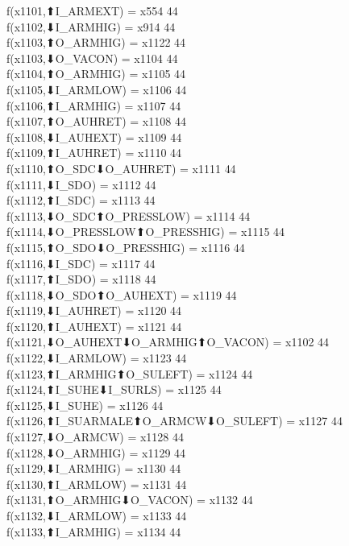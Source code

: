 f(x1101,⬆I_ARMEXT) = x554 {44} \\
f(x1102,⬇I_ARMHIG) = x914 {44} \\
f(x1103,⬆O_ARMHIG) = x1122 {44} \\
f(x1103,⬇O_VACON) = x1104 {44} \\
f(x1104,⬆O_ARMHIG) = x1105 {44} \\
f(x1105,⬇I_ARMLOW) = x1106 {44} \\
f(x1106,⬆I_ARMHIG) = x1107 {44} \\
f(x1107,⬆O_AUHRET) = x1108 {44} \\
f(x1108,⬇I_AUHEXT) = x1109 {44} \\
f(x1109,⬆I_AUHRET) = x1110 {44} \\
f(x1110,⬆O_SDC⬇O_AUHRET) = x1111 {44} \\
f(x1111,⬇I_SDO) = x1112 {44} \\
f(x1112,⬆I_SDC) = x1113 {44} \\
f(x1113,⬇O_SDC⬆O_PRESSLOW) = x1114 {44} \\
f(x1114,⬇O_PRESSLOW⬆O_PRESSHIG) = x1115 {44} \\
f(x1115,⬆O_SDO⬇O_PRESSHIG) = x1116 {44} \\
f(x1116,⬇I_SDC) = x1117 {44} \\
f(x1117,⬆I_SDO) = x1118 {44} \\
f(x1118,⬇O_SDO⬆O_AUHEXT) = x1119 {44} \\
f(x1119,⬇I_AUHRET) = x1120 {44} \\
f(x1120,⬆I_AUHEXT) = x1121 {44} \\
f(x1121,⬇O_AUHEXT⬇O_ARMHIG⬆O_VACON) = x1102 {44} \\
f(x1122,⬇I_ARMLOW) = x1123 {44} \\
f(x1123,⬆I_ARMHIG⬆O_SULEFT) = x1124 {44} \\
f(x1124,⬆I_SUHE⬇I_SURLS) = x1125 {44} \\
f(x1125,⬇I_SUHE) = x1126 {44} \\
f(x1126,⬆I_SUARMALE⬆O_ARMCW⬇O_SULEFT) = x1127 {44} \\
f(x1127,⬇O_ARMCW) = x1128 {44} \\
f(x1128,⬇O_ARMHIG) = x1129 {44} \\
f(x1129,⬇I_ARMHIG) = x1130 {44} \\
f(x1130,⬆I_ARMLOW) = x1131 {44} \\
f(x1131,⬆O_ARMHIG⬇O_VACON) = x1132 {44} \\
f(x1132,⬇I_ARMLOW) = x1133 {44} \\
f(x1133,⬆I_ARMHIG) = x1134 {44} \\
